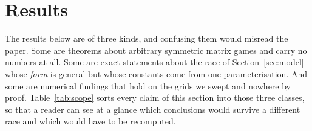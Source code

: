 \documentclass[pdflatex]{sn-jnl}
\theoremstyle{thmstyleone}
\theoremstyle{thmstylethree}
\theoremstyle{thmstyletwo}
\begin{document}
\section{Results}\label{sec:results}

The results below are of three kinds, and confusing them would misread the
paper. Some are theorems about arbitrary symmetric matrix games and carry no
numbers at all. Some are exact statements about the race of
Section~\ref{sec:model} whose \emph{form} is general but whose constants come
from one parameterisation. And some are numerical findings that hold on the
grids we swept and nowhere by proof. Table~\ref{tab:scope} sorts every claim
of this section into those three classes, so that a reader can see at a glance
which conclusions would survive a different race and which would have to be
recomputed.
\end{document}
